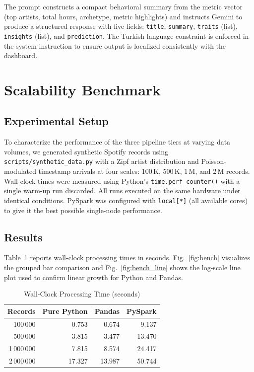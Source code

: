 \documentclass[conference]{IEEEtran}
\newcommand{\tabletight}{\footnotesize\setlength{\tabcolsep}{3.5pt}\renewcommand{\arraystretch}{1.08}}
\begin{document}
The prompt constructs a compact behavioral summary from the metric vector
(top artists, total hours, archetype, metric highlights) and instructs
Gemini to produce a structured response with five fields: \texttt{title},
\texttt{summary}, \texttt{traits} (list), \texttt{insights} (list), and
\texttt{prediction}. The Turkish language constraint is enforced in the
system instruction to ensure output is localized consistently with the
dashboard.

\section{Scalability Benchmark}

\subsection{Experimental Setup}

To characterize the performance of the three pipeline tiers at varying data
volumes, we generated synthetic Spotify records using
\texttt{scripts/synthetic\_data.py} with a Zipf artist distribution and
Poisson-modulated timestamp arrivals at four scales: 100\,K, 500\,K, 1\,M,
and 2\,M records. Wall-clock times were measured using Python's
\texttt{time.perf\_counter()} with a single warm-up run discarded.
All runs executed on the same hardware under identical conditions.
PySpark was configured with \texttt{local[*]} (all available cores) to give
it the best possible single-node performance.

\subsection{Results}

Table~\ref{tab:bench} reports wall-clock processing times in seconds.
Fig.~\ref{fig:bench} visualizes the grouped bar comparison and
Fig.~\ref{fig:bench_line} shows the log-scale line plot used to
confirm linear growth for Python and Pandas.

\begin{table}[!t]
\caption{Wall-Clock Processing Time (seconds)}
\label{tab:bench}
\centering
\tabletight
\begin{tabular}{rrrr}
\toprule
\textbf{Records} & \textbf{Pure Python} & \textbf{Pandas} & \textbf{PySpark} \\
\midrule
100\,000    & 0.753  & 0.674  & 9.137  \\
500\,000    & 3.815  & 3.477  & 13.470 \\
1\,000\,000 & 7.815  & 8.574  & 24.417 \\
2\,000\,000 & 17.327 & 13.987 & 50.744 \\
\bottomrule
\end{tabular}
\end{table}
\end{document}
